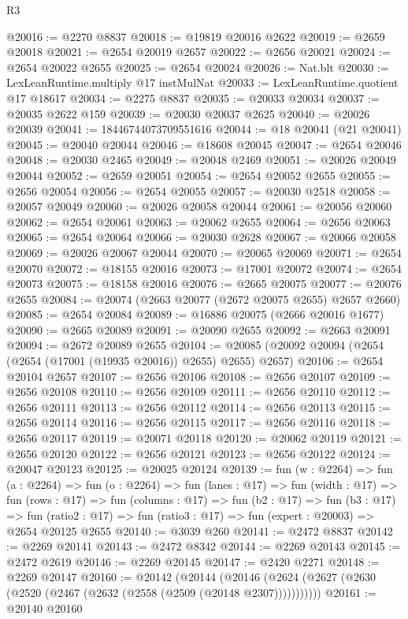 \begin{lexlean}{R3}
\begin{coremodule}
@20016 := @2270 @8837
@20018 := @19819 @20016 @2622
@20019 := @2659 @20018
@20021 := @2654 @20019 @2657
@20022 := @2656 @20021
@20024 := @2654 @20022 @2655
@20025 := @2654 @20024
@20026 := Nat.blt
@20030 := LexLeanRuntime.multiply @17 instMulNat
@20033 := LexLeanRuntime.quotient @17 @18617
@20034 := @2275 @8837
@20035 := @20033 @20034
@20037 := @20035 @2622 @159
@20039 := @20030 @20037 @2625
@20040 := @20026 @20039
@20041 := 18446744073709551616
@20044 := @18 @20041 (@21 @20041)
@20045 := @20040 @20044
@20046 := @18608 @20045
@20047 := @2654 @20046
@20048 := @20030 @2465
@20049 := @20048 @2469
@20051 := @20026 @20049 @20044
@20052 := @2659 @20051
@20054 := @2654 @20052 @2655
@20055 := @2656 @20054
@20056 := @2654 @20055
@20057 := @20030 @2518
@20058 := @20057 @20049
@20060 := @20026 @20058 @20044
@20061 := @20056 @20060
@20062 := @2654 @20061
@20063 := @20062 @2655
@20064 := @2656 @20063
@20065 := @2654 @20064
@20066 := @20030 @2628
@20067 := @20066 @20058
@20069 := @20026 @20067 @20044
@20070 := @20065 @20069
@20071 := @2654 @20070
@20072 := @18155 @20016
@20073 := @17001 @20072
@20074 := @2654 @20073
@20075 := @18158 @20016
@20076 := @2665 @20075
@20077 := @20076 @2655
@20084 := @20074 (@2663 @20077 (@2672 @20075 @2655) @2657 @2660)
@20085 := @2654 @20084
@20089 := @16886 @20075 (@2666 @20016 @1677)
@20090 := @2665 @20089
@20091 := @20090 @2655
@20092 := @2663 @20091
@20094 := @2672 @20089 @2655
@20104 := @20085 (@20092 @20094 (@2654 (@2654 (@17001 (@19935 @20016)) @2655) @2655) @2657)
@20106 := @2654 @20104 @2657
@20107 := @2656 @20106
@20108 := @2656 @20107
@20109 := @2656 @20108
@20110 := @2656 @20109
@20111 := @2656 @20110
@20112 := @2656 @20111
@20113 := @2656 @20112
@20114 := @2656 @20113
@20115 := @2656 @20114
@20116 := @2656 @20115
@20117 := @2656 @20116
@20118 := @2656 @20117
@20119 := @20071 @20118
@20120 := @20062 @20119
@20121 := @2656 @20120
@20122 := @2656 @20121
@20123 := @2656 @20122
@20124 := @20047 @20123
@20125 := @20025 @20124
@20139 := fun (w : @2264) =>
  fun (a : @2264) =>
  fun (o : @2264) =>
  fun (lanes : @17) =>
  fun (width : @17) =>
  fun (rows : @17) =>
  fun (columns : @17) =>
  fun (b2 : @17) =>
  fun (b3 : @17) =>
  fun (ratio2 : @17) => fun (ratio3 : @17) => fun (expert : @20003) => @2654 @20125 @2655
@20140 := @3039 @260
@20141 := @2472 @8837
@20142 := @2269 @20141
@20143 := @2472 @8342
@20144 := @2269 @20143
@20145 := @2472 @2619
@20146 := @2269 @20145
@20147 := @2420 @2271
@20148 := @2269 @20147
@20160 := @20142
    (@20144 (@20146 (@2624 (@2627 (@2630 (@2520 (@2467 (@2632 (@2558 (@2509 (@20148 @2307)))))))))))
@20161 := @20140 @20160

\end{coremodule}
\end{lexlean}
